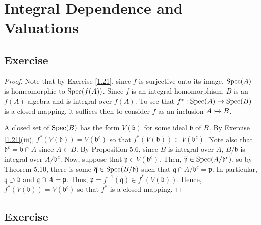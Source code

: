 \section{Integral Dependence and Valuations}

\subsection{Exercise}\label{5.1}

\begin{proof}
Note that by Exercise \ref{1.21}, since $f$ is surjective onto its image, $\operatorname{Spec}(A)$ is homeomorphic to $\operatorname{Spec}(f(A))$.
Since $f$ is an integral homomorphism, $B$ is an $f(A)$-algebra and is integral over $f(A)$. To see that $f^* : \operatorname{Spec}(A) \to \operatorname{Spec}(B)$ 
is a closed mapping, it suffices then to consider $f$ as an inclusion $A \xhookrightarrow{} B$.

A closed set of $\operatorname{Spec}(B)$ has the form $V(\mathfrak{b})$ for some ideal $\mathfrak{b}$ of $B$. By Exercise \ref{1.21}(iii),
$\overline{f^*(V(\mathfrak{b}))} = V(\mathfrak{b}^c)$ so that $f^*(V(\mathfrak{b})) \subset V(\mathfrak{b}^c)$. Note also that
$\mathfrak{b}^c = \mathfrak{b} \cap A$ since $A \subset B$. By Proposition 5.6, since $B$ is integral over $A$, $B/\mathfrak{b}$
is integral over $A/\mathfrak{b}^c$. Now, suppose that $\mathfrak{p} \in V(\mathfrak{b}^c)$. Then, $\overline{\mathfrak{p}} \in \operatorname{Spec}(A/\mathfrak{b}^c)$,
so by Theorem 5.10, there is some $\overline{\mathfrak{q}} \in \operatorname{Spec}(B/\mathfrak{b})$ such that $\overline{\mathfrak{q}} \cap A/\mathfrak{b}^c = \overline{\mathfrak{p}}$. 
In particular, $\mathfrak{q} \supset \mathfrak{b}$ and $\mathfrak{q} \cap A = \mathfrak{p}$. Thus, $\mathfrak{p} = f^{-1}(\mathfrak{q}) \in f^*(V(\mathfrak{b}))$. 
Hence, $f^*(V(\mathfrak{b})) = V(\mathfrak{b}^c)$ so that $f^*$ is a closed mapping.
\end{proof}

\subsection{Exercise}\label{5.2}

